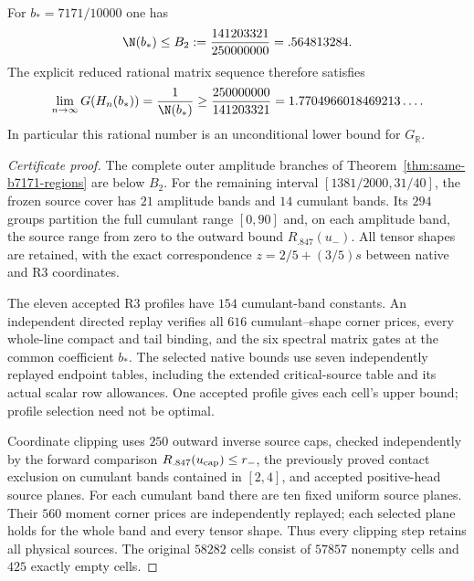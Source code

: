 \begin{theorem}
\label{thm:global-b7171-polygon}
For $b_*=7171/10000$ one has
\[
 \N(b_*)\le B_2:=\frac{141203321}{250000000}=.564813284.
\]
The explicit reduced rational matrix sequence therefore satisfies
\[
 \lim_{n\to\infty}G(H_n(b_*))
 =\frac1{\N(b_*)}
 \ge\frac{250000000}{141203321}
 =1.7704966018469213\ldots .
\]
In particular this rational number is an unconditional lower bound for
$G_{\mathbb R}$.
\end{theorem}
\begin{proof}[Certificate proof]
The complete outer amplitude branches of
Theorem~\ref{thm:same-b7171-regions} are below $B_2$.
For the remaining interval $[1381/2000,31/40]$, the frozen source cover
has $21$ amplitude bands and $14$ cumulant bands. Its $294$ groups
partition the full cumulant range $[0,90]$ and, on each amplitude band,
the source range from zero to the outward bound $R_{.847}(u_-)$.
All tensor shapes are retained, with the exact correspondence
$z=2/5+(3/5)s$ between native and R3 coordinates.

The eleven accepted R3 profiles have $154$ cumulant-band constants.
An independent directed replay verifies all $616$ cumulant--shape
corner prices, every whole-line compact and tail binding, and the six
spectral matrix gates at the common coefficient $b_*$. The selected
native bounds use seven independently replayed endpoint tables,
including the extended critical-source table and its actual scalar
row allowances. One accepted profile gives each cell's upper bound;
profile selection need not be optimal.

Coordinate clipping uses $250$ outward inverse source caps, checked
independently by the forward comparison $R_{.847}(u_{\rm cap})\le r_-$,
the previously proved contact exclusion on cumulant bands contained
in $[2,4]$, and accepted positive-head source planes. For each cumulant
band there are ten fixed uniform source planes. Their $560$ moment
corner prices are independently replayed; each selected plane holds
for the whole band and every tensor shape. Thus every clipping step
retains all physical sources. The original $58282$ cells consist of
$57857$ nonempty cells and $425$ exactly empty cells.


\end{proof}
